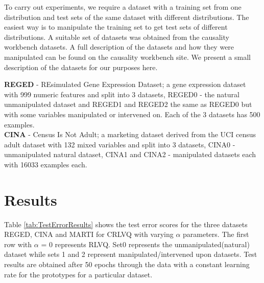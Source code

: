 \documentclass{esannV2}
\begin{document}
To carry out experiments, we require a dataset with a training set from one distribution and test sets of the same dataset with different distributions. The easiest way is to manipulate the training set to get test sets of different distributions. A suitable set of datasets was obtained from the causality workbench datasets\cite{13}. A full description of the datasets and how they were manipulated can be found on the causality workbench site. We present a small description of the datasets for our purposes here.

\noindent
\textbf{REGED} - REsimulated Gene Expression Dataset; a gene expression dataset with 999 numeric features and split into 3 datasets, REGED0 - the natural unmanipulated dataset and REGED1 and REGED2 the same as REGED0 but with some variables manipulated or intervened on. Each of the 3 datasets has 500 examples.\\
\noindent
\textbf{CINA} - Census Is Not Adult; a marketing dataset derived from the UCI census adult dataset with 132 mixed variables and split into 3 datasets, CINA0 - unmanipulated natural dataset, CINA1 and CINA2 - manipulated datasets each with 16033 examples each.


\section{Results}
\label{sec:Results}

Table \ref{tab:TestErrorResults} shows the test error scores for the three datasets REGED, CINA and MARTI for CRLVQ with varying $\alpha$ parameters. The first row with $\alpha$ = 0 represents RLVQ. Set0 represents the unmanipulated(natural) dataset while sets 1 and 2 represent manipulated/intervened upon datasets. Test results are obtained after 50 epochs through the data with a constant learning rate for the prototypes for a particular dataset.
\end{document}
